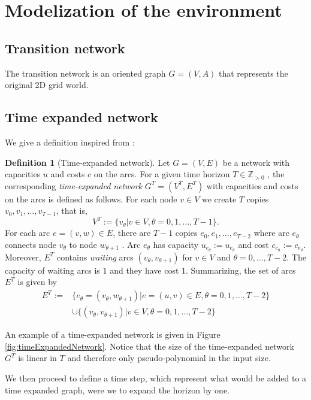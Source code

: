 \documentclass[14pt,a4paper]{article}
\theoremstyle{definition}
\newtheorem{madef}{Definition}[section]
\numberwithin{equation}{subsection}
\begin{document}
\newpage
\section{Modelization of the environment}
\subsection{Transition network}

The transition network is an oriented graph $G = (V,A)$ that represents the original 2D grid world.

\subsection{Time expanded network}
\label{ten}
We give a definition inspired from \cite[p.~19]{Skutella2008AnIT}:
\begin{madef}[Time-expanded network]
	 Let $G = (V, E)$ be a network with capacities $u$ and costs $c$ on the arcs. For a given time horizon $T\in \mathds{Z}_{>0}$ ,	the corresponding \emph{time-expanded network} $G^T = (V^T, E^T)$ with capacities and costs on the arcs
	is defined as follows. For each node $v\in V$ we create $T$ copies $v_0 , v_1 , \ldots, v_{T-1} $, that is,
	$$V^T := \{v_\theta | v \in V, \theta = 0, 1, \ldots, T-1\}.$$
	For each arc $e = (v, w) \in E$, there are $T-1$  copies $e_0,e_1,\ldots,e_{T-2}$ where arc $e_\theta$ connects
	node $v_\theta$ to node $w_{\theta+1}$ . Arc $e_\theta$ has capacity $u_{e_{\theta}}:= u_{e_\theta}$ and cost $c_{e_{\theta}}:= c_{e_\theta}$. Moreover, $E^T$ contains
	\emph{waiting} arcs $(v_\theta , v _{\theta+1})$ for $v \in V$ and $\theta = 0,\ldots, T-2$. The capacity of waiting arcs is $1$
	and they have cost $1$. Summarizing, the set of arcs $E^T$ is given by
	\begin{align*}
	 E^T := &\{e_\theta = (v_\theta,w_{\theta+1})| e = (u,v) \in E, \theta=0,1,\ldots,T-2 \} \\
	 &\cup \{(v_\theta,v_{\theta+1})|v\in V, \theta=0,1,\ldots,T-2 \}
	 \end{align*}
\end{madef}

An example of a time-expanded network is given in Figure \ref{fig:timeExpandedNetwork}. Notice that the size of the	time-expanded network $G^T$ is linear in $T$ and therefore only pseudo-polynomial in the input
size.


We then proceed to define a time step, which represent what would be added to a time expanded graph, were we to expand the horizon by one.
\end{document}

